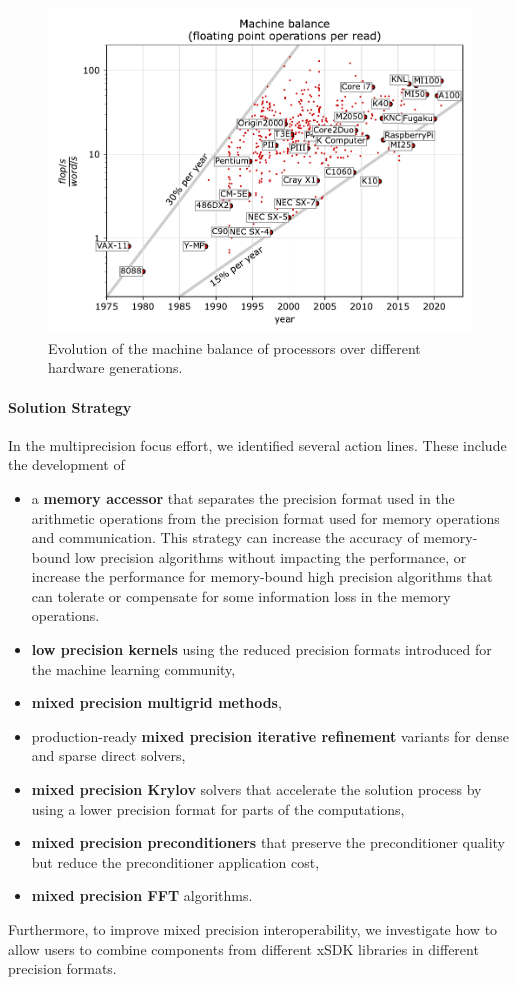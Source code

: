 \begin{figure}[htb]
	\centering
	\includegraphics[width=.8\columnwidth]{projects/2.3.3-MathLibs/2.3.3.01-xSDK/xSDK-machinebalance.pdf}
	\caption{\label{fig:xsdk-machinebalance} Evolution of the machine balance of processors over different hardware generations.}
\end{figure}


\paragraph{Solution Strategy}
In the multiprecision focus effort, we identified several action lines. These include the development of
\begin{itemize}
\item a \textbf{memory accessor} that separates the precision format used in the arithmetic operations from the precision format used for memory operations and communication. This strategy can increase the accuracy of memory-bound low precision algorithms without impacting the performance, or increase the performance for memory-bound high precision algorithms that can tolerate or compensate for some information loss in the memory operations.
\item \textbf{low precision kernels} using the reduced precision formats introduced for the machine learning community,
\item \textbf{mixed precision multigrid methods},
\item production-ready \textbf{mixed precision iterative refinement} variants for dense and sparse direct solvers,
\item \textbf{mixed precision Krylov} solvers that accelerate the solution process by using a lower precision format for parts of the computations,
\item \textbf{mixed precision preconditioners} that preserve the preconditioner quality but reduce the preconditioner application cost,
\item \textbf{mixed precision FFT} algorithms.
\end{itemize}
Furthermore, to improve mixed precision interoperability, we investigate how to allow users to combine components from different xSDK libraries in different precision formats.


